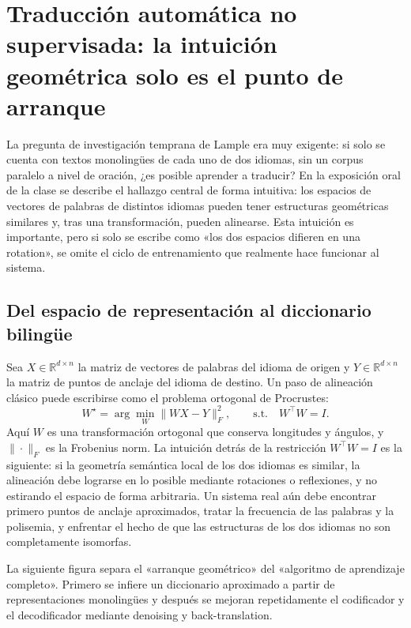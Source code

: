 \section{Traducción automática no supervisada: la intuición geométrica solo es el punto de arranque}

La pregunta de investigación temprana de Lample era muy exigente: si solo se cuenta con textos monolingües de cada uno de dos idiomas, sin un corpus paralelo a nivel de oración, ¿es posible aprender a traducir? En la exposición oral de la clase se describe el hallazgo central de forma intuitiva: los espacios de vectores de palabras de distintos idiomas pueden tener estructuras geométricas similares y, tras una transformación, pueden alinearse. Esta intuición es importante, pero si solo se escribe como «los dos espacios difieren en una rotation», se omite el ciclo de entrenamiento que realmente hace funcionar al sistema.

\subsection{Del espacio de representación al diccionario bilingüe}

Sea $X\in\mathbb{R}^{d\times n}$ la matriz de vectores de palabras del idioma de origen y $Y\in\mathbb{R}^{d\times n}$ la matriz de puntos de anclaje del idioma de destino. Un paso de alineación clásico puede escribirse como el problema ortogonal de Procrustes:
\[
W^{\star}=\arg\min_{W}\|WX-Y\|_{F}^{2},
\qquad \text{s.t.}\quad W^{\top}W=I.
\]
Aquí $W$ es una transformación ortogonal que conserva longitudes y ángulos, y $\|\cdot\|_{F}$ es la Frobenius norm. La intuición detrás de la restricción $W^{\top}W=I$ es la siguiente: si la geometría semántica local de los dos idiomas es similar, la alineación debe lograrse en lo posible mediante rotaciones o reflexiones, y no estirando el espacio de forma arbitraria. Un sistema real aún debe encontrar primero puntos de anclaje aproximados, tratar la frecuencia de las palabras y la polisemia, y enfrentar el hecho de que las estructuras de los dos idiomas no son completamente isomorfas.

La siguiente figura separa el «arranque geométrico» del «algoritmo de aprendizaje completo». Primero se infiere un diccionario aproximado a partir de representaciones monolingües y después se mejoran repetidamente el codificador y el decodificador mediante denoising y back-translation.


